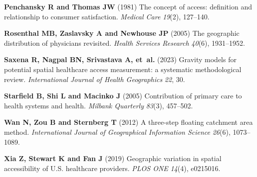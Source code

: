 \documentclass{CUP-JNL-DAP}%
\begin{document}
\begin{Backmatter}
\begin{thebibliography}{}
\textbf{Penchansky R and Thomas JW} (1981) The concept of access: definition and relationship to consumer satisfaction. \textit{Medical Care} \textit{19}(2), 127--140.

\textbf{Rosenthal MB, Zaslavsky A and Newhouse JP} (2005) The geographic distribution of physicians revisited. \textit{Health Services Research} \textit{40}(6), 1931--1952.

\textbf{Saxena R, Nagpal BN, Srivastava A, et~al.} (2023) Gravity models for potential spatial healthcare access measurement: a systematic methodological review. \textit{International Journal of Health Geographics} \textit{22}, 30.

\textbf{Starfield B, Shi L and Macinko J} (2005) Contribution of primary care to health systems and health. \textit{Milbank Quarterly} \textit{83}(3), 457--502.

\textbf{Wan N, Zou B and Sternberg T} (2012) A three-step floating catchment area method. \textit{International Journal of Geographical Information Science} \textit{26}(6), 1073--1089.

\textbf{Xia Z, Stewart K and Fan J} (2019) Geographic variation in spatial accessibility of U.S. healthcare providers. \textit{PLOS ONE} \textit{14}(4), e0215016.

\end{thebibliography}

\end{Backmatter}
\end{document}
